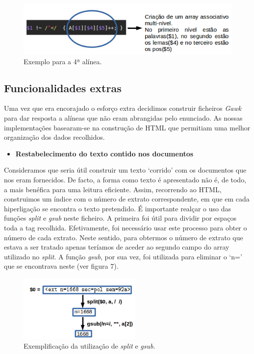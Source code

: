 \documentclass[a4paper]{article}
\begin{document}
\begin{figure}[h!]
  \includegraphics[width=150mm]{ArrayAssociativo.png} \centering
  \caption{Exemplo para a 4ª alínea.}
  \label{fig:alinea4}
\end{figure}





\subsection{Funcionalidades extras}
Uma vez que era encorajado o esforço extra decidimos construir ficheiros \textit{Gawk} para dar resposta a alíneas que não eram abrangidas pelo enunciado. 
As nossas implementações basearam-se na construção de HTML que permitiam uma melhor organização dos dados recolhidos.



 \begin{itemize}
	\item \textbf{Restabelecimento do texto contido nos documentos} 
\end{itemize}
Consideramos que seria útil construir um texto `corrido' com os documentos que nos eram fornecidos. De facto, a forma como texto é apresentado não é, de todo, a mais benéfica para uma leitura eficiente. Assim, recorrendo ao HTML, construimos um índice com o número de extrato correspondente, em que em cada hiperligação se encontra o texto pretendido. É importante realçar o uso das funções \textit{split} e \textit{gsub} neste ficheiro. A primeira foi útil para dividir por espaços toda a tag recolhida. 
Efetivamente, foi necessário usar este processo para obter o número de cada extrato. Neste sentido, para obtermos o número de extrato que estava a ser tratado apenas teríamos de aceder ao segundo campo do array utilizado no \textit{split}.
A função \textit{gsub}, por sua vez, foi utilizada para eliminar o `n=' que se encontrava neste (ver figura 7).    


\begin{figure}[h!]
  \includegraphics[width=60mm]{Exemplo4.png} \centering
  \caption{Exemplificação da utilização de \textit{split} e \textit{gsub}.}
  \label{fig:Exemplo 4}
\end{figure}
\end{document}
